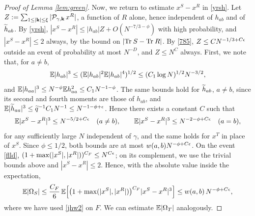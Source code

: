 \begin{proof}[Proof of Lemma \ref{lem:green}]
Now, we return to estimate $x^S-x^R$ in \eqref{yrsh}. Let $Z:=\sum_{1\le|{\bf k}|\le\xi}|\mathcal P_{\gamma,{\bf k}}\,x^R|$, a function of $R$ alone, hence independent of $h_{ab}$ and of $\widetilde h_{ab}$. By \eqref{yrsh}, $|x^S-x^R|\le|h_{ab}|Z+O(N^{-7/3-\phi})$ with high probability, and $|x^S-x^R|\le2$ always, by the bound on $|\mathrm{Tr}\: S-\mathrm{Tr}\: R|$. By \eqref{785}, $Z\le CN^{-1/3+C\epsilon}$ outside an event of probability at most $N^{-D}$, and $Z\le N^C$ always. First, we note that, for $a\ne b$,
$$
\mathbb{E} |h_{ab}|^3\leq (\mathbb{E}|h_{ab}|^2\mathbb{E}|h_{ab}|^4)^{1/2}\le (C_1\log N)^{1/2}N^{-3/2},
$$
and $\mathbb{E}|h_{aa}|^3\le N^{-\phi}\mathbb{E} h_{aa}^2\le C_1N^{-1-\phi}$. The same bounds hold for $\widetilde h_{ab}$, $a\ne b$, since its second and fourth moments are those of $h_{ab}$, and $\mathbb{E}|\widetilde h_{aa}|^3\le\widetilde q^{-1}C_1N^{-1}\le N^{-1-\phi+\epsilon}$. Hence there exists a constant $C$ such that
\begin{equation}
\mathbb{E}  |x^S - x^R|^3 \leq N^{  -5/2+C\epsilon} \quad (a\ne b), \qquad \mathbb{E}  |x^S - x^R|^3 \leq N^{  -2-\phi+C\epsilon} \quad (a=b),
\end{equation}
for any sufficiently large $N$ independent of $\gamma$, and the same holds for $x^T$ in place of $x^S$. Since $\phi\le1/2$, both bounds are at most $w(a,b)N^{-\phi+C\epsilon}$. On the event \eqref{flld}, $(1+\max(|x^S|,|x^R|))^{C_F}\le N^{C\epsilon}$; on its complement, we use the trivial bounds above and $|x^S-x^R|\le2$. Hence, with the absolute value inside the expectation,
\begin{equation}
\mathbb{E}|\Omega_S|\le \frac{C_F}{6}\,\mathbb{E} \Big[ \big(1+\max(|x^S|,|x^R|)\big)^{C_F} |x^S - x^R|^3 \Big] \leq w(a,b)\,N^{  - \phi+C\epsilon},
\end{equation}
where we have used \eqref{jhw2} on $F$. We can estimate $\mathbb{E}|\Omega_T|$ analogously.


\end{proof}
